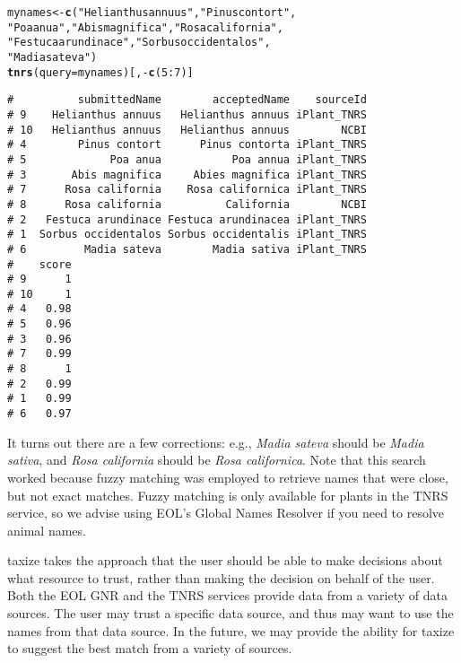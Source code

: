 \documentclass[10pt,a4paper,twocolumn]{article}\usepackage[]{graphicx}\usepackage[]{color}
\makeatletter
\newcommand{\hlnum}[1]{\textcolor[rgb]{0.686,0.059,0.569}{#1}}%
\newcommand{\hlstr}[1]{\textcolor[rgb]{0.192,0.494,0.8}{#1}}%
\newcommand{\hlopt}[1]{\textcolor[rgb]{0,0,0}{#1}}%
\newcommand{\hlstd}[1]{\textcolor[rgb]{0.345,0.345,0.345}{#1}}%
\newcommand{\hlkwb}[1]{\textcolor[rgb]{0.69,0.353,0.396}{#1}}%
\newcommand{\hlkwc}[1]{\textcolor[rgb]{0.333,0.667,0.333}{#1}}%
\newcommand{\hlkwd}[1]{\textcolor[rgb]{0.737,0.353,0.396}{\textbf{#1}}}%
\newenvironment{kframe}{%
 \def\at@end@of@kframe{}%
 \ifinner\ifhmode%
  \def\at@end@of@kframe{\end{minipage}}%
  \begin{minipage}{\columnwidth}%
 \fi\fi%
 \def\FrameCommand##1{\hskip\@totalleftmargin \hskip-\fboxsep
 \colorbox{shadecolor}{##1}\hskip-\fboxsep
     \hskip-\linewidth \hskip-\@totalleftmargin \hskip\columnwidth}%
 \MakeFramed {\advance\hsize-\width
   \@totalleftmargin\z@ \linewidth\hsize
   \@setminipage}}%
 {\par\unskip\endMakeFramed%
 \at@end@of@kframe}
\newenvironment{knitrout}{}{} %
\makeatother
\begin{document}
\begin{knitrout}\scriptsize
{}\color{fgcolor}\begin{kframe}
\begin{alltt}
\hlstd{mynames} \hlkwb{<-} \hlkwd{c}\hlstd{(}\hlstr{"Helianthus annuus"}\hlstd{,} \hlstr{"Pinus contort"}\hlstd{,}
             \hlstr{"Poa anua"}\hlstd{,} \hlstr{"Abis magnifica"}\hlstd{,} \hlstr{"Rosa california"}\hlstd{,}
             \hlstr{"Festuca arundinace"}\hlstd{,} \hlstr{"Sorbus occidentalos"}\hlstd{,}
             \hlstr{"Madia sateva"}\hlstd{)}
\hlkwd{tnrs}\hlstd{(}\hlkwc{query} \hlstd{= mynames)[ ,} \hlopt{-}\hlkwd{c}\hlstd{(}\hlnum{5}\hlopt{:}\hlnum{7}\hlstd{)]}
\end{alltt}
\begin{verbatim}
#          submittedName        acceptedName    sourceId
# 9    Helianthus annuus   Helianthus annuus iPlant_TNRS
# 10   Helianthus annuus   Helianthus annuus        NCBI
# 4        Pinus contort      Pinus contorta iPlant_TNRS
# 5             Poa anua           Poa annua iPlant_TNRS
# 3       Abis magnifica     Abies magnifica iPlant_TNRS
# 7      Rosa california    Rosa californica iPlant_TNRS
# 8      Rosa california          California        NCBI
# 2   Festuca arundinace Festuca arundinacea iPlant_TNRS
# 1  Sorbus occidentalos Sorbus occidentalis iPlant_TNRS
# 6         Madia sateva        Madia sativa iPlant_TNRS
#    score
# 9      1
# 10     1
# 4   0.98
# 5   0.96
# 3   0.96
# 7   0.99
# 8      1
# 2   0.99
# 1   0.99
# 6   0.97
\end{verbatim}
\end{kframe}
\end{knitrout}


It turns out there are a few corrections: e.g., \emph{Madia sateva} should be \emph{Madia sativa}, and \emph{Rosa california} should be \emph{Rosa californica}. Note that this search worked because fuzzy matching was employed to retrieve names that were close, but not exact matches. Fuzzy matching is only available for plants in the TNRS service, so we advise using EOL's Global Names Resolver if you need to resolve animal names.

taxize takes the approach that the user should be able to make decisions about what resource to trust, rather than making the decision on behalf of the user. Both the EOL GNR and the TNRS services provide data from a variety of data sources. The user may trust a specific data source, and thus may want to use the names from that data source. In the future, we may provide the ability for taxize to suggest the best match from a variety of sources.
\end{document}
